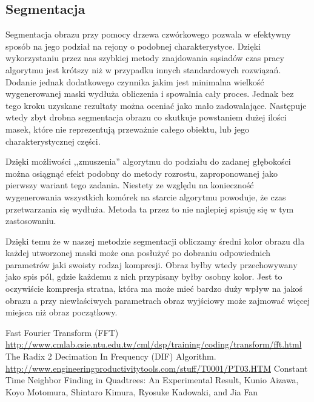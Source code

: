\documentclass{classrep}
\begin{document}
\subsection{Segmentacja}

Segmentacja obrazu przy pomocy drzewa czwórkowego pozwala w efektywny sposób na jego podział na rejony o podobnej charakterystyce. Dzięki wykorzystaniu przez nas szybkiej metody znajdowania sąsiadów czas pracy algorytmu jest krótszy niż w przypadku innych standardowych rozwiązań. Dodanie jednak dodatkowego czynnika jakim jest minimalna wielkość wygenerowanej maski wydłuża obliczenia i spowalnia cały proces. Jednak bez tego kroku uzyskane rezultaty można oceniać jako mało zadowalające. Następuje wtedy zbyt drobna segmentacja obrazu co skutkuje powstaniem dużej ilości masek, które nie reprezentują przeważnie całego obiektu, lub jego charakterystycznej części. 

Dzięki możliwości ,,zmuszenia'' algorytmu do podziału do zadanej głębokości można osiągnąć efekt podobny do metody rozrostu, zaproponowanej jako pierwszy wariant tego zadania. Niestety ze względu na konieczność wygenerowania wszystkich komórek na starcie algorytmu powoduje, że czas przetwarzania się wydłuża. Metoda ta przez to nie najlepiej spisuję się w tym zastosowaniu.

Dzięki temu że w naszej metodzie segmentacji obliczamy średni kolor obrazu dla każdej utworzonej maski może ona posłużyć po dobraniu odpowiednich parametrów jaki swoisty rodzaj kompresji. Obraz byłby wtedy przechowywany jako spis pól, gdzie każdemu z nich przypisany byłby osobny kolor. Jest to oczywiście kompresja stratna, która ma może mieć bardzo duży wpływ na jakoś obrazu a przy niewłaściwych parametrach obraz wyjściowy może zajmować więcej miejsca niż obraz początkowy.

\begin{thebibliography}{8}

 Fast Fourier Transform (FFT) \url{http://www.cmlab.csie.ntu.edu.tw/cml/dsp/training/coding/transform/fft.html}
 The Radix 2 Decimation In Frequency (DIF) Algorithm.  \url{http://www.engineeringproductivitytools.com/stuff/T0001/PT03.HTM}
 Constant Time Neighbor Finding in Quadtrees: An Experimental Result, Kunio Aizawa, Koyo Motomura, Shintaro Kimura, Ryosuke Kadowaki, and Jia Fan
\end{thebibliography}
\end{document}
